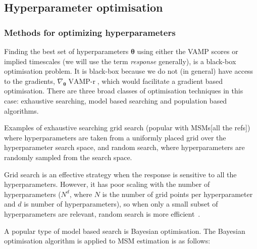 \documentclass[journal=jacsat,manuscript=article]{achemso}
\begin{document}
\subsection{Hyperparameter optimisation}

\subsubsection{Methods for optimizing hyperparameters}

Finding the best set of hyperparameters $\bm{\theta}$ using either the VAMP scores or implied timescales (we will use the term \emph{response} generally), is a black-box optimisation problem.  It is black-box because we do not (in general) have access to the gradients, $\nabla_{\bm{\theta}} \operatorname{VAMP-r}$, which would facilitate a gradient based optimisation.  There are three broad classes of optimisation techniques in this case: exhaustive searching,  model based searching and population based algorithms. 

Examples of exhaustive searching grid search (popular with MSMs[all the refs]) where hyperparameters are taken from a uniformly placed grid over the hyperparameter search space, and random search, where hyperparameters are randomly sampled from the search space. 

Grid search is an effective strategy when the response is sensitive to all the hyperparameters.  However, it has poor scaling with the number of hyperparameters ($N^d$, where $N$ is the number of grid points per hyperparameter and $d$ is number of hyperparameters), so when only a small subset of hyperparameters are relevant, random search is more efficient~\cite{bergstra_jamesbergstra_random_2012}.  

A popular type of model based search is Bayesian optimisation. The Bayesian optimisation algorithm is applied to MSM estimation is as follows: 
\end{document}
